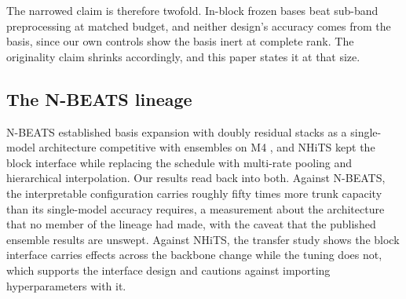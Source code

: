The narrowed claim is therefore twofold. In-block frozen bases beat
sub-band preprocessing at matched budget, and neither design's accuracy
comes from the basis, since our own controls show the basis inert at
complete rank. The originality claim shrinks accordingly, and this paper
states it at that size.

\subsection{The N-BEATS lineage}
\label{sec:related:nbeats}

N-BEATS \citep{oreshkin2020nbeats} established basis expansion with
doubly residual stacks as a single-model architecture competitive with
ensembles on M4 \citep{makridakis2020m4}, and NHiTS
\citep{challu2023nhits} kept the block interface while replacing the
schedule with multi-rate pooling and hierarchical interpolation. Our
results read back into both. Against N-BEATS, the interpretable
configuration carries roughly fifty times more trunk capacity than its
single-model accuracy requires, a measurement about the architecture
that no member of the lineage had made, with the caveat that the
published ensemble results are unswept. Against NHiTS, the transfer
study shows the block interface carries effects across the backbone
change while the tuning does not, which supports the interface design
and cautions against importing hyperparameters with it.


